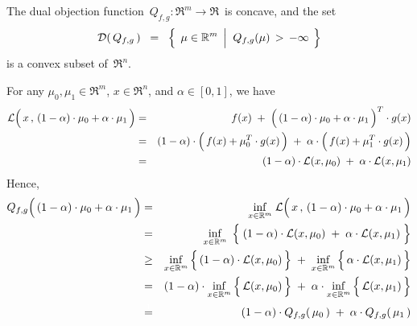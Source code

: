\vskip 0.5cm
\begin{theorem}
\mbox{}
\vskip 0.1cm
\noindent
The dual objection function \,$Q_{f,g} : \Re^{m} \longrightarrow \Re$\, is concave,
and the set
\begin{equation*}
\mathcal{D}(\,Q_{f,g}\,)
\;\; = \;\;
	\left\{\;\,
		\mu \in \Re^{m}
		\;\left\vert\;\;
		Q_{f,g}(\mu) \,\overset{{\color{white}.}}{>}\, -\infty
		\right.
		\;\right\}
\end{equation*}
is a convex subset of \,$\Re^{n}$.
\end{theorem}
\proof
For any $\mu_{0}, \mu_{1} \in \Re^{m}$, $x \in \Re^{n}$, and $\alpha \in [0,1]$, we have
\begin{eqnarray*}
\mathcal{L}\!\left(\,x\,,\,(1-\alpha)\cdot\mu_{0}\overset{{\color{white}.}}{+}\alpha\cdot\mu_{1}\,\right)
& = &
	f(x) \;+\; \left(\,(1-\alpha)\cdot\mu_{0}\overset{{\color{white}.}}{+}\alpha\cdot\mu_{1}\,\right)^{T} \cdot g(x)
\\
& = &
	(1-\alpha)\cdot
	\left(\,f(x) \overset{{\color{white}.}}{+} \mu_{0}^{T}\cdot g(x)\,\right)
	\;+\;
	\alpha\cdot
	\left(\,f(x) \overset{{\color{white}.}}{+}\mu_{1}^{T} \cdot g(x)\,\right)
\\
& = &
	(1-\alpha) \cdot \mathcal{L}(x,\mu_{0})
	\;+\;
	\alpha \cdot \mathcal{L}(x,\mu_{1})
\end{eqnarray*}
Hence,
\begin{eqnarray*}
Q_{f,g}\!\left(\,(1-\alpha)\cdot\mu_{0}\overset{{\color{white}.}}{+}\alpha\cdot\mu_{1}\,\right)
& = &
	\underset{x\in\Re^{m}}{\inf}\;
	\mathcal{L}\!\left(\,x\,,\,(1-\alpha)\cdot\mu_{0}\overset{{\color{white}.}}{+}\alpha\cdot\mu_{1}\,\right)
\\
& = &
	\underset{x\in\Re^{m}}{\inf}\;\left\{\;
		(1-\alpha) \cdot \mathcal{L}(x,\mu_{0})
		\;\overset{{\color{white}.}}{+}\;
		\alpha \cdot \mathcal{L}(x,\mu_{1})
		\;\right\}
\\
& \geq &
	\underset{x\in\Re^{m}}{\inf}\left\{\,
		(1-\alpha) \cdot
		\overset{{\color{white}.}}{\mathcal{L}(x,\mu_{0})}
		\,\right\}
	\; + \;
	\underset{x\in\Re^{m}}{\inf}\left\{\,
		\alpha \cdot
		\overset{{\color{white}.}}{\mathcal{L}(x,\mu_{1})}
		\,\right\}
\\
& = &
	(1-\alpha) \cdot
	\underset{x\in\Re^{m}}{\inf}\left\{\,
		\overset{{\color{white}.}}{\mathcal{L}(x,\mu_{0})}
		\,\right\}
	\; + \;
	\alpha \cdot
	\underset{x\in\Re^{m}}{\inf}\left\{\,
		\overset{{\color{white}.}}{\mathcal{L}(x,\mu_{1})}
		\,\right\}
\\
& \overset{{\color{white}1}}{=} &
	(1-\alpha) \cdot Q_{f,g}(\,\mu_{0}\,)
	\; + \;
	\alpha \cdot Q_{f,g}(\,\mu_{1}\,)
\end{eqnarray*}
